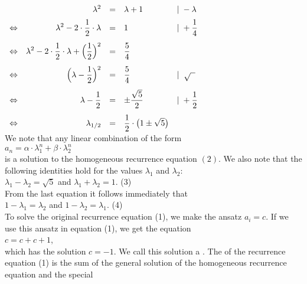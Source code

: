 \hspace*{1.3cm}
$\begin{array}{lrcll}
                &  \lambda^2 & = & \lambda + 1 & |\;- \lambda \\[0.2cm]
\Leftrightarrow & \displaystyle \lambda^2 - 2 \cdot \frac{1}{2} \cdot\lambda & = & 1 & |\;\displaystyle+ \frac{1}{4} \\[0.4cm]
\Leftrightarrow & \displaystyle \lambda^2 - 2 \cdot \frac{1}{2} \cdot\lambda + \Big(\frac{1}{2}\Big)^2 & = & \displaystyle\frac{5}{4} & \\[0.4cm]
\Leftrightarrow & \displaystyle \Big(\lambda -\frac{1}{2}\Big)^2 & = & \displaystyle\frac{5}{4}         & | \;\;\sqrt{\;\;} \\[0.4cm]
\Leftrightarrow & \displaystyle \lambda -\frac{1}{2} & = & \displaystyle\pm\frac{\sqrt{5}}{2} & | \displaystyle\;+ \frac{1}{2} \\[0.4cm]
\Leftrightarrow & \displaystyle \lambda_{1/2} & = & \displaystyle\frac{1}{2} \cdot \bigl(1 \pm \sqrt{5}\bigr) & 
 \end{array}
 $
\\[0.2cm]
We note that any linear combination of the form
\\[0.2cm]
\hspace*{1.3cm}
$a_n = \alpha \cdot \lambda_1^n + \beta \cdot \lambda_2^n$
\\[0.2cm]
is a solution to the homogeneous recurrence equation $(2)$.
We also note that the following identities hold for the values $\lambda_1$ and $\lambda_2$:
\\[0.2cm]
\hspace*{1.3cm} 
$\lambda_1 - \lambda_2 = \sqrt{5}$ \quad and \quad $\lambda_1 + \lambda_2 = 1$. \hspace*{\fill} (3)
\\[0.2cm]
From the last equation it follows immediately that \\[0.2cm]
\hspace*{1.3cm} $1 - \lambda_1 = \lambda_2$ \quad and \quad $1 - \lambda_2 = \lambda_1$. \hspace*{\fill} (4)
\\[0.1cm]
To solve the original recurrence equation (1), we make the  ansatz
$a_i = c$.  If we use this ansatz in equation (1), we get the equation \\[0.2cm]
\hspace*{1.3cm}
$c = c + c + 1$,
\\[0.2cm]
which has the solution $c = -1$.  We call this solution a .
The  of the recurrence equation (1) 
is the sum of the general solution of the homogeneous recurrence equation and the special
